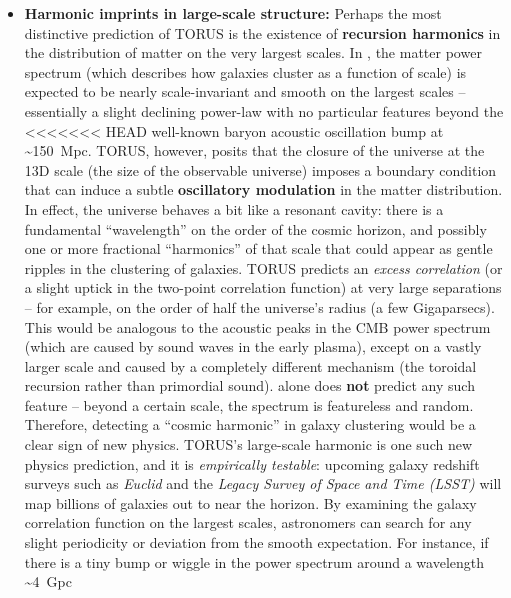 \documentclass[]{article}
\begin{document}
\begin{itemize}
\item
  \textbf{Harmonic imprints in large-scale structure:} Perhaps the most
  distinctive prediction of TORUS is the existence of \textbf{recursion
  harmonics} in the distribution of matter on the very largest scales.
  In \LambdaCDM, the matter power spectrum (which describes how galaxies
  cluster as a function of scale) is expected to be nearly
  scale-invariant and smooth on the largest scales -- essentially a
  slight declining power-law with no particular features beyond the
<<<<<<< HEAD
  well-known baryon acoustic oscillation bump at \textasciitilde150~Mpc.
  TORUS, however, posits that the closure of the universe at the 13D
  scale (the size of the observable universe) imposes a boundary
  condition that can induce a subtle \textbf{oscillatory modulation} in
  the matter distribution\hspace{0pt}. In effect, the universe behaves a
  bit like a resonant cavity: there is a fundamental ``wavelength'' on
  the order of the cosmic horizon, and possibly one or more fractional
  ``harmonics'' of that scale that could appear as gentle ripples in the
  clustering of galaxies. TORUS predicts an \emph{excess correlation}
  (or a slight uptick in the two-point correlation function) at very
  large separations -- for example, on the order of half the universe's
  radius (a few Gigaparsecs)\hspace{0pt}. This would be analogous to the
  acoustic peaks in the CMB power spectrum (which are caused by sound
  waves in the early plasma), except on a vastly larger scale and caused
  by a completely different mechanism (the toroidal recursion rather
  than primordial sound). \LambdaCDM alone does \textbf{not} predict any such
  feature -- beyond a certain scale, the \LambdaCDM spectrum is featureless
  and random. Therefore, detecting a ``cosmic harmonic'' in galaxy
  clustering would be a clear sign of new physics. TORUS's large-scale
  harmonic is one such new physics prediction, and it is
  \emph{empirically testable}: upcoming galaxy redshift surveys such as
  \emph{Euclid} and the \emph{Legacy Survey of Space and Time (LSST)}
  will map billions of galaxies out to near the horizon. By examining
  the galaxy correlation function on the largest scales, astronomers can
  search for any slight periodicity or deviation from the smooth \LambdaCDM
  expectation\hspace{0pt}. For instance, if there is a tiny bump or
  wiggle in the power spectrum around a wavelength \textasciitilde4~Gpc

\end{itemize}
\end{document}
